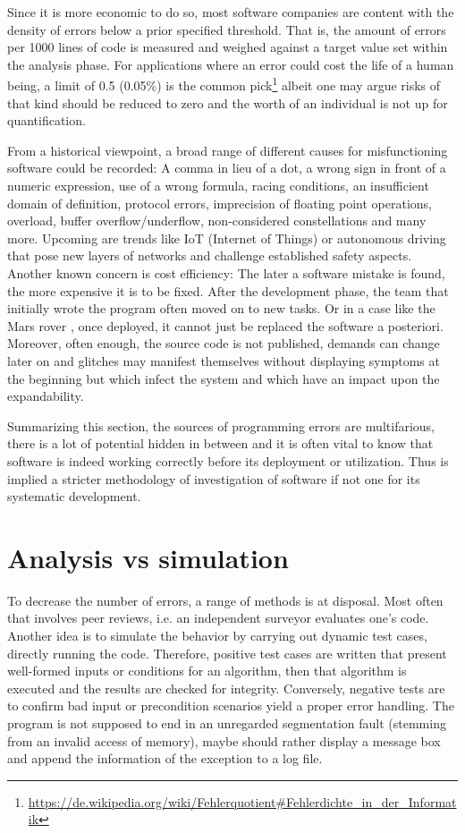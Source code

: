 Since it is more economic to do so, most software companies are content with the density of errors below a prior specified threshold. That is, the amount of errors per 1000 lines of code is measured and weighed against a target value set within the analysis phase. For applications where an error could cost the life of a human being, a limit of 0.5 (0.05\%) is the common pick\footnote{\url{https://de.wikipedia.org/wiki/Fehlerquotient\#Fehlerdichte_in_der_Informatik}} albeit one may argue risks of that kind should be reduced to zero and the worth of an individual is not up for quantification.

From a historical viewpoint, a broad range of different causes for misfunctioning software could be recorded: A comma in lieu of a dot, a wrong sign in front of a numeric expression, use of a wrong formula, racing conditions, an insufficient domain of definition, protocol errors, imprecision of floating point operations, overload, buffer overflow/underflow, non-considered constellations and many more. Upcoming are trends like IoT (Internet of Things) or autonomous driving that pose new layers of networks and challenge established safety aspects. Another known concern is cost efficiency: The later a software mistake is found, the more expensive it is to be fixed. After the development phase, the team that initially wrote the program often moved on to new tasks. Or in a case like the Mars rover , once deployed, it cannot just be replaced the software a posteriori. Moreover, often enough, the source code is not published, demands can change later on and glitches may manifest themselves without displaying symptoms at the beginning but which infect the system and which have an impact upon the expandability.

Summarizing this section, the sources of programming errors are multifarious, there is a lot of potential hidden in between and it is often vital to know that software is indeed working correctly before its deployment or utilization. Thus is implied a stricter methodology of investigation of software if not one for its systematic development.

\section{Analysis vs simulation}
To decrease the number of errors, a range of methods is at disposal. Most often that involves peer reviews, i.e. an independent surveyor evaluates one's code. Another idea is to simulate the behavior by carrying out dynamic test cases, directly running the code. Therefore, positive test cases are written that present well-formed inputs or conditions for an algorithm, then that algorithm is executed and the results are checked for integrity. Conversely, negative tests are to confirm bad input or precondition scenarios yield a proper error handling. The program is not supposed to end in an unregarded segmentation fault (stemming from an invalid access of memory), maybe should rather display a message box and append the information of the exception to a log file.

